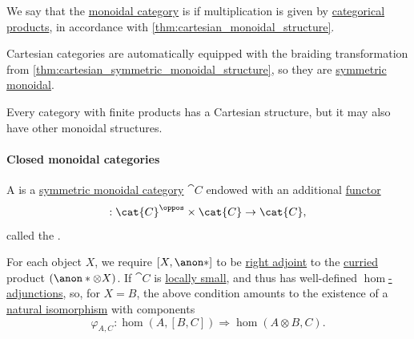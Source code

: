 \begin{definition}\label{def:cartesian_monoidal_category}
  We say that the \hyperref[def:monoidal_category]{monoidal category} is  if multiplication is given by \hyperref[def:categorical_product]{categorical products}, in accordance with \cref{thm:cartesian_monoidal_structure}.

  Cartesian categories are automatically equipped with the braiding transformation from \cref{thm:cartesian_symmetric_monoidal_structure}, so they are \hyperref[def:symmetric_monoidal_category]{symmetric monoidal}.
\end{definition}
\begin{comments}
  \item Every category with finite products has a Cartesian structure, but it may also have other monoidal structures.
\end{comments}

\paragraph{Closed monoidal categories}

\begin{definition}\label{def:closed_monoidal_category}
  A  is a \hyperref[def:symmetric_monoidal_category]{symmetric monoidal category} \( \cat{C} \) endowed with an additional \hyperref[def:functor]{functor}
  \begin{equation*}
    [\anon*, \anon*]: \cat{C}^\oppos \times \cat{C} \to \cat{C},
  \end{equation*}
  called the .

  For each object \( X \), we require \( [X, \anon*] \) to be \hyperref[def:adjoint_functor]{right adjoint} to the \hyperref[con:currying]{curried} product \( (\anon* \otimes X) \). If \( \cat{C} \) is \hyperref[def:small_category]{locally small}, and thus has well-defined \hyperref[def:hom_adjunction]{\( \hom \)-adjunctions}, so, for \( X = B \), the above condition amounts to the existence of a \hyperref[def:natural_isomorphism]{natural isomorphism} with components
  \begin{equation*}
    \varphi_{A, C}: \hom(A, [B, C]) \Rightarrow \hom(A \otimes B, C).
  \end{equation*}
\end{definition}

